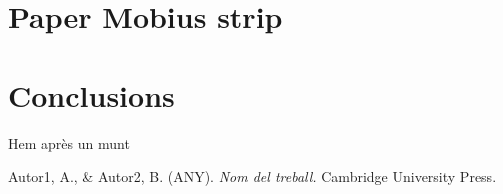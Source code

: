 \documentclass[11pt,a4paper,openright,oneside]{book}
\numberwithin{equation}{section}
\theoremstyle{definition}
\begin{document}
\newpage
\chapter{Paper Mobius strip}

\newpage
\chapter{Conclusions}

Hem après un munt

\normalfont

\newpage

\begin{thebibliography}{25}

Autor1, A., \& Autor2, B. (ANY).
\newblock \textit{Nom del treball.}
\newblock Cambridge University Press.

\end{thebibliography}
\end{document}
